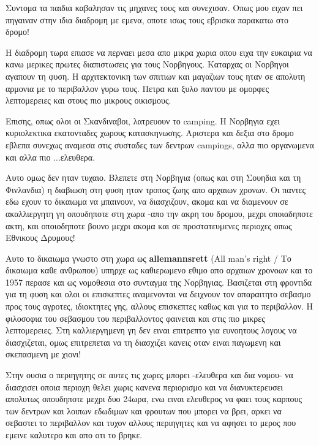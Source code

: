 Συντομα τα παιδια καβαλησαν τις μηχανες τους και συνεχισαν. Οπως μου ειχαν πει πηγαιναν στην ιδια διαδρομη με εμενα, οποτε ισως τους εβρισκα παρακατω στο δρομο! 

Η διαδρομη τωρα επιασε να περναει μεσα απο μικρα χωρια οπου ειχα την ευκαιρια να κανω μερικες πρωτες διαπιστωσεις για τους Νορβηγους. 
Καταρχας οι Νορβηγοι αγαπουν τη φυση.
Η αρχιτεκτονικη των σπιτιων και μαγαζιων τους ηταν σε απολυτη αρμονια με το περιβαλλον γυρω τους. 
Πετρα και ξυλο παντου με ομορφες λεπτομερειες και στους πιο μικρους οικισμους.


Επισης, οπως ολοι οι Σκανδιναβοι, λατρευουν το camping. Η Νορβηγια εχει κυριολεκτικα εκατονταδες χωρους κατασκηνωσης. Αριστερα και δεξια στο δρομο εβλεπα συνεχως αναμεσα στις συσταδες των δεντρων campings, αλλα πιο οργανωμενα και αλλα πιο ...ελευθερα.


Αυτο ομως δεν ηταν τυχαιο. 
Βλεπετε στη Νορβηγια (οπως και στη Σουηδια και τη Φινλανδια) η διαβιωση στη φυση ηταν τροπος ζωης απο αρχαιων χρονων. 
Οι παντες εδω εχουν το δικαιωμα να μπαινουν, να διασχιζουν, ακομα και να διαμενουν σε ακαλλιεργητη γη οπουδηποτε στη χωρα -απο την ακρη του δρομου, μεχρι οποιαδηποτε ακτη, και οποιοδηποτε βουνο μεχρι ακομα και σε προστατευμενες περιοχες οπως Εθνικους Δρυμους!

Αυτο το δικαιωμα γνωστο στη χωρα ως \textbf{allemannsrett} (All man's right / Το δικαιωμα καθε ανθρωπου) υπηρχε ως καθιερωμενο εθιμο απο αρχαιων χρονοων και το 1957 περασε και ως νομοθεσια στο συνταγμα της Νορβηγιας. 
Βασιζεται στη φροντιδα για τη φυση και ολοι οι επισκεπτες αναμενονται να δειχνουν τον απαραιτητο σεβασμο προς τους αγροτες, ιδιοκτητες γης, αλλους επισκεπτες καθως και για το περιβαλλον. 
Η φιλοσοφια του σεβασμου του περιβαλλοντος φαινεται και στις πιο μικρες λεπτομερειες. Στη καλλιεργημενη γη δεν ειναι επιτρεπτο για ευνοητους λογους να διασχιζεται, ομως επιτρεπεται να τη διασχιζει κανεις οταν ειναι παγωμενη και σκεπασμενη με χιονι! 

Στην ουσια ο περιηγητης σε αυτες τις χωρες μπορει -ελευθερα και δια νομου- να διασχισει οποια περιοχη θελει χωρις κανενα περιορισμο και να διανυκτερευσει απολυτως οπουδηποτε μεχρι δυο 24ωρα, ενω ειναι ελευθερος να φαει τους καρπους των δεντρων και λοιπων εδωδιμων και φρουτων που μπορει να βρει, αρκει να σεβαστει το περιβαλλον και τυχον αλλους περιηγητες και να αφησει το μερος που εμεινε καλυτερο και απο οτι το βρηκε.

